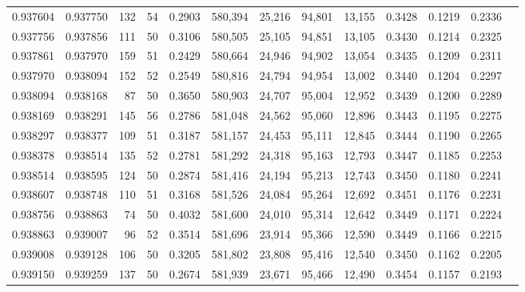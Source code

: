 \begin{tabular}{rrrrrrrrrrrrr}
0.937604 & 0.937750 &   132 &  54 &                                     0.2903 & 580,394 &  25,216 &  94,801 &  13,155 & 0.3428 & 0.1219 & 0.2336 \\
0.937756 & 0.937856 &   111 &  50 &                                     0.3106 & 580,505 &  25,105 &  94,851 &  13,105 & 0.3430 & 0.1214 & 0.2325 \\
0.937861 & 0.937970 &   159 &  51 &                                     0.2429 & 580,664 &  24,946 &  94,902 &  13,054 & 0.3435 & 0.1209 & 0.2311 \\
0.937970 & 0.938094 &   152 &  52 &                                     0.2549 & 580,816 &  24,794 &  94,954 &  13,002 & 0.3440 & 0.1204 & 0.2297 \\
0.938094 & 0.938168 &    87 &  50 &                                     0.3650 & 580,903 &  24,707 &  95,004 &  12,952 & 0.3439 & 0.1200 & 0.2289 \\
0.938169 & 0.938291 &   145 &  56 &                                     0.2786 & 581,048 &  24,562 &  95,060 &  12,896 & 0.3443 & 0.1195 & 0.2275 \\
0.938297 & 0.938377 &   109 &  51 &                                     0.3187 & 581,157 &  24,453 &  95,111 &  12,845 & 0.3444 & 0.1190 & 0.2265 \\
0.938378 & 0.938514 &   135 &  52 &                                     0.2781 & 581,292 &  24,318 &  95,163 &  12,793 & 0.3447 & 0.1185 & 0.2253 \\
0.938514 & 0.938595 &   124 &  50 &                                     0.2874 & 581,416 &  24,194 &  95,213 &  12,743 & 0.3450 & 0.1180 & 0.2241 \\
0.938607 & 0.938748 &   110 &  51 &                                     0.3168 & 581,526 &  24,084 &  95,264 &  12,692 & 0.3451 & 0.1176 & 0.2231 \\
0.938756 & 0.938863 &    74 &  50 &                                     0.4032 & 581,600 &  24,010 &  95,314 &  12,642 & 0.3449 & 0.1171 & 0.2224 \\
0.938863 & 0.939007 &    96 &  52 &                                     0.3514 & 581,696 &  23,914 &  95,366 &  12,590 & 0.3449 & 0.1166 & 0.2215 \\
0.939008 & 0.939128 &   106 &  50 &                                     0.3205 & 581,802 &  23,808 &  95,416 &  12,540 & 0.3450 & 0.1162 & 0.2205 \\
0.939150 & 0.939259 &   137 &  50 &                                     0.2674 & 581,939 &  23,671 &  95,466 &  12,490 & 0.3454 & 0.1157 & 0.2193 \\

\end{tabular}
